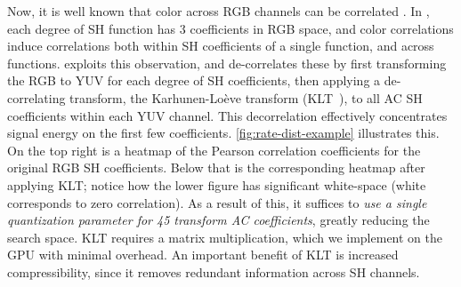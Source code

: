 Now, it is well known that color across RGB channels can be correlated \cite{1990RGBcorr}. 
%
In \gs{}, each degree of SH function has 3 coefficients in RGB space, and color correlations induce correlations both within SH coefficients of a single function, and across functions.
%
\gsnfs{} exploits this observation, and de-correlates these by first transforming the RGB to YUV for each degree of SH coefficients, then applying a de-correlating transform, the Karhunen-Loève transform (KLT~\cite{KLT}), to all AC SH coefficients within each YUV channel.
%
This decorrelation effectively concentrates signal energy on the first few coefficients.
%
\cref{fig:rate-dist-example} illustrates this.
%
On the top right is a heatmap of the Pearson correlation coefficients for the original RGB SH coefficients.
%
Below that is the corresponding heatmap after applying KLT; notice how the lower figure has significant white-space (white corresponds to zero correlation).
%
As a result of this, it suffices to \textit{use a single quantization parameter for 45 transform AC coefficients}, greatly reducing the search space.
%
KLT requires a matrix multiplication, which we implement on the GPU with minimal overhead.
%
An important benefit of KLT is increased compressibility, since it removes redundant information across SH channels.




